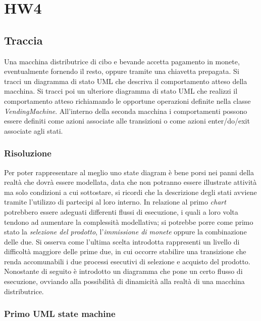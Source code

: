 \documentclass{article}
\begin{document}
\pagestyle{empty}


\section*{HW4}
\large

\subsection*{Traccia}
\large
Una macchina distributrice di cibo e bevande accetta pagamento in monete, eventualmente fornendo il resto, oppure tramite una chiavetta prepagata. Si tracci un diagramma di stato UML che descriva il comportamento atteso della macchina. Si tracci poi un ulteriore diagramma di stato UML che realizzi il comportamento atteso richiamando le opportune operazioni definite nella classe \textit{VendingMachine}. All'interno della seconda macchina i comportamenti possono essere definiti come azioni associate alle transizioni o come azioni enter/do/exit associate agli stati. 

\subsubsection*{Risoluzione}
Per poter rappresentare al meglio uno state diagram è bene porsi nei panni della realtà che dovrà essere modellata, data che non potranno essere illustrate attività ma solo condizioni a cui sottostare, si ricordi che la descrizione degli stati avviene tramite l'utilizzo di partecipi al loro interno. In relazione al primo \textit{chart} potrebbero essere adeguati differenti flussi di esecuzione, i quali a loro volta tendono ad aumentare la complessità modellativa; si potrebbe porre come primo stato la \textit{selezione del prodotto}, l'\textit{immissione di monete} oppure la combinazione delle due. Si osserva come l'ultima scelta introdotta rappresenti un livello di difficoltà maggiore delle prime due, in cui occorre stabilire una transizione che renda accomunabili i due processi esecutivi di selezione e acquisto del prodotto.\vspace*{14pt}\\
Nonostante di seguito è introdotto un diagramma che pone un certo flusso di esecuzione, ovviando alla possibilità di dinamicità alla realtà di una macchina distributrice.
\subsubsection*{Primo UML state machine}
\large
\end{document}
